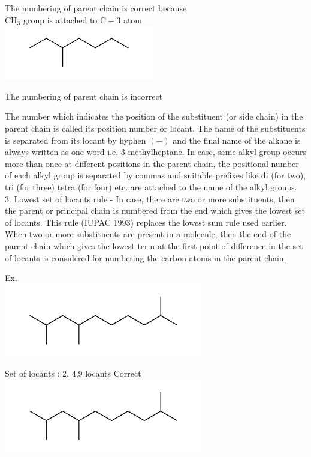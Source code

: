 \documentclass[10pt]{article}
\begin{document}
The numbering of parent chain is correct because\\
$\mathrm{CH}_{3}$ group is attached to $\mathrm{C}-3$ atom\\
\includegraphics{smile-7778c06c05bb38204887bf2c2105cee6d313d307}

The numbering of parent chain is incorrect

The number which indicates the position of the substituent (or side chain) in the parent chain is called its position number or locant. The name of the substituents is separated from its locant by hyphen $(-)$ and the final name of the alkane is always written as one word i.e. 3-methylheptane. In case, same alkyl group occurs more than once at different positions in the parent chain, the positional number of each alkyl group is separated by commas and suitable prefixes like di (for two), tri (for three) tetra (for four) etc. are attached to the name of the alkyl groups.\\
3. Lowest set of locants rule - In case, there are two or more substituents, then the parent or principal chain is numbered from the end which gives the lowest set of locants. This rule (IUPAC 1993) replaces the lowest sum rule used earlier. When two or more substituents are present in a molecule, then the end of the parent chain which gives the lowest term at the first point of difference in the set of locants is considered for numbering the carbon atoms in the parent chain.

Ex.\\
\includegraphics{smile-fd958f065ee02fd41d29a18b67f07e156a81c4d5}

Set of locants : 2, 4,9 locants Correct\\
\includegraphics{smile-0709ae9e8b85bb11bf01315c60d3b9ec5f5ced40}
\end{document}
